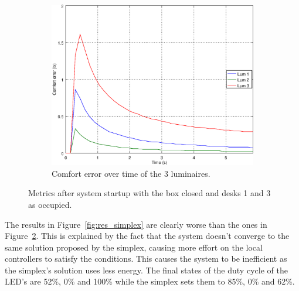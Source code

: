 \begin{figure}[ht]
\begin{subfigure}[t]{0.32\textwidth}
    \centering
    \includegraphics[width=.95\textwidth]{img/n_closed_o101}
    \caption{Comfort error over time of the 3 luminaires.}
    \label{fig:n_closed_o101}
    \end{subfigure}
    \caption{Metrics after system startup with the box closed and desks 1 and 3 as occupied. }
    \label{fig:closed_o101}
\end{figure}

The results in Figure~\ref{fig:res_simplex}  are clearly worse than the ones in Figure~\ref{fig:closed_o101}. This is explained by the fact that the system doesn't converge to the same solution proposed by the simplex, causing more effort on the local controllers to satisfy the conditions. This causes the system to be inefficient as the simplex's solution uses less energy. The final states of the duty cycle of the LED's are 52\%, 0\% and 100\% while the simplex sets them to 85\%, 0\% and 62\%.

